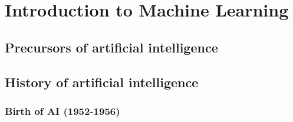 \renewcommand{\prevpart}{0 }
\renewcommand{\thispart}{1 }
\renewcommand{\nextpart}{2 }

\section{Introduction to Machine Learning}





\subsection{Precursors of artificial intelligence}

\subsection{History of artificial intelligence}


\subsubsection{Birth of AI (1952-1956)}

